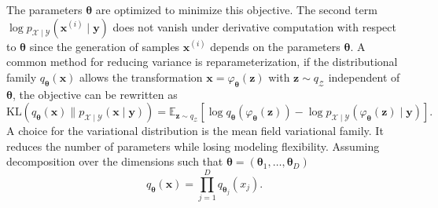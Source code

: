 The parameters $\boldsymbol{\theta}$ are optimized to minimize this objective. The second term $\log p_{\mathcal{X}\mid \mathcal{Y}}\!\left(\boldsymbol{x}^{(i)}\mid \boldsymbol{y}\right)$ does not vanish under derivative computation with respect to $\boldsymbol{\theta}$ since the generation of  samples $\boldsymbol{x}^{(i)}$ depends on the parameters $\boldsymbol{\theta}$. 
A common method for reducing variance is reparameterization, if the distributional family $q_{\boldsymbol{\theta}}\!\left(\boldsymbol{x}\right)$ allows the transformation $\boldsymbol{x}=\varphi_{\boldsymbol{\theta}}(\boldsymbol{z})$ with $\boldsymbol{z}\sim q_{\mathcal{Z}}$ independent of $\boldsymbol{\theta}$, the objective can be rewritten as
\begin{equation}    
       \mathrm{KL}\!\left(q_{\boldsymbol{\theta}}(\boldsymbol{x})\|p_{\mathcal{X}\mid \mathcal{Y}}\!\left(\boldsymbol{x}\mid \boldsymbol{y}\right)\right)
    = \mathbb{E}_{\boldsymbol{z}\sim q_{\mathcal{Z}}} \!\left[\log q_{\boldsymbol{\theta}}\left(\varphi_{\boldsymbol{\theta}}(\boldsymbol{z})\right) - \log p_{\mathcal{X}\mid \mathcal{Y}}\!\left(\varphi_{\boldsymbol{\theta}}(\boldsymbol{z})\mid \boldsymbol{y}\right)\right].
\end{equation}
A choice for the variational distribution is the mean field variational family. It reduces the number of parameters while losing modeling flexibility. Assuming decomposition over the dimensions such that $\boldsymbol{\theta} = (\boldsymbol{\theta}_1,\dots, \boldsymbol{\theta}_D)$
\begin{equation*}
    q_{\boldsymbol{\theta}}(\boldsymbol{x})=\prod_{j=1}^{D} q_{\boldsymbol{\theta}_j}(x_j).
\end{equation*}


